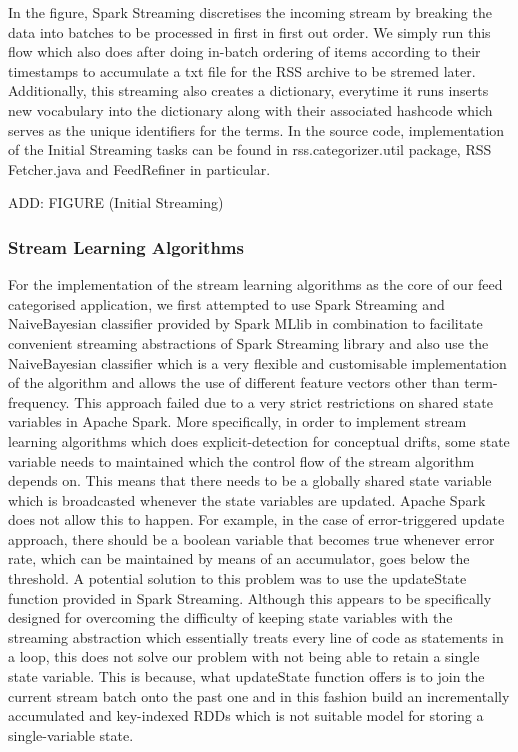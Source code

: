\documentclass[12pt]{article}
\begin{document}
In the figure, Spark Streaming discretises the incoming stream by breaking the data into batches to be processed in first in first out order. We simply run this flow which also does after doing in-batch ordering of items according to their timestamps to accumulate a txt file for the RSS archive to be stremed later. Additionally, this streaming also creates a dictionary, everytime it runs inserts new vocabulary into the dictionary along with their associated hashcode which serves as the unique identifiers for the terms. In the source code, implementation of the Initial Streaming tasks can be found in rss.categorizer.util package, RSS Fetcher.java and FeedRefiner in particular.

ADD: FIGURE (Initial Streaming)

\subsubsection{Stream Learning Algorithms}

For the implementation of the stream learning algorithms as the core of our feed categorised application, we first attempted to use Spark Streaming and NaiveBayesian classifier provided by Spark MLlib in combination to facilitate convenient streaming abstractions of Spark Streaming library and also use the NaiveBayesian classifier which is a very flexible and customisable implementation of the algorithm and allows the use of different feature vectors other than term-frequency. This approach failed due to a very strict restrictions on shared state variables in Apache Spark. More specifically, in order to implement stream learning algorithms which does explicit-detection for conceptual drifts, some state variable needs to maintained which the control flow of the stream algorithm depends on. This means that there needs to be a globally shared state variable which is broadcasted whenever the state variables are updated. Apache Spark does not allow this to happen. For example, in the case of error-triggered update approach, there should be a boolean variable that becomes true whenever error rate, which can be maintained by means of an accumulator, goes below the threshold. A potential solution to this problem was to use the updateState function provided in Spark Streaming. Although this appears to be specifically designed for overcoming the difficulty of keeping state variables with the streaming abstraction which essentially treats every line of code as statements in a loop, this does not solve our problem with not being able to retain a single state variable. This is because, what updateState function offers is to join the current stream batch onto the past one and in this fashion build an incrementally accumulated and key-indexed RDDs which is not suitable model for storing a single-variable state. 
 
\end{document}

